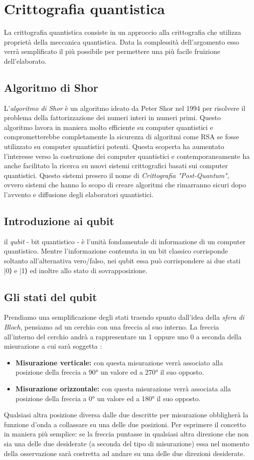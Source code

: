 \documentclass[a4paper, 12pt]{article}
\begin{document}
\section{Crittografia quantistica}
La crittografia quantistica consiste in un approccio alla crittografia che utilizza proprietà della meccanica quantistica. Data la complessità dell'argomento esso verrà semplificato il più possibile per permettere una più facile fruizione dell'elaborato.
\subsection{Algoritmo di Shor}
L'\textit{algoritmo di Shor} è un algoritmo ideato da Peter Shor nel 1994 per risolvere il problema della fattorizzazione dei numeri interi in numeri primi.
Questo algoritmo lavora in maniera molto efficiente su computer quantistici e comprometterebbe completamente la sicurezza di algoritmi come RSA se fosse utilizzato su computer quantistici potenti. Questa scoperta ha aumentato l'interesse verso la costruzione dei computer quantistici e contemporaneamente ha anche facilitato la ricerca su nuovi sistemi crittografici basati sui computer quantistici. Questo sistemi presero il nome di \textit{Crittografia "Post-Quantum"}, ovvero sistemi che hanno lo scopo di creare algoritmi che rimarranno sicuri dopo l'avvento e diffusione degli elaboratori quantistici. 

\subsection{Introduzione ai qubit}
il \textit{qubit} - bit quantistico - è l'unità fondamentale di informazione di un computer quantistico.
Mentre l'informazione contenuta in un bit classico corrisponde soltanto all'alternativa vero/falso, nei qubit essa può corrispondere ai due stati |0⟩ e |1⟩ ed inoltre allo stato di sovrapposizione.
\subsection{Gli stati del qubit}
Prendiamo una semplificazione degli stati traendo spunto dall'idea della \textit{sfera di Bloch}, pensiamo ad un cerchio con una freccia al suo interno. La freccia all'interno del cerchio andrà a rappresentare un 1 oppure uno 0 a seconda della misurazione a cui sarà soggetta :
\begin{itemize}
	\item \textbf{Misurazione verticale:} con questa misurazione verrà associato alla posizione della freccia a 90° un valore ed a 270° il suo opposto.
	\item \textbf{Misurazione orizzontale:} con questa misurazione verrà associata alla posizione della freccia a 0° un valore ed a 180° il suo opposto.
\end{itemize} 
Qualsiasi altra posizione diversa dalle due descritte per misurazione obbligherà la funzione d'onda a collassare su una delle due posizioni. Per esprimere il concetto in maniera più semplice: se la freccia puntasse in qualsiasi altra direzione che non sia una delle due desiderate (a seconda del tipo di misurazione) essa nel momento della osservazione sarà costretta ad andare su una delle due direzioni desiderate.
\end{document}
